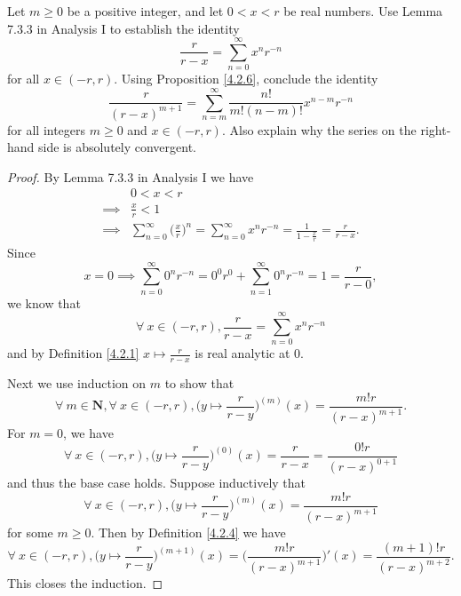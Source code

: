\begin{exercise}\label{ex 4.2.7}
    Let \(m \geq 0\) be a positive integer, and let \(0 < x < r\) be real numbers.
    Use Lemma 7.3.3 in Analysis I to establish the identity
    \[
        \frac{r}{r - x} = \sum_{n = 0}^\infty x^n r^{-n}
    \]
    for all \(x \in (-r, r)\).
    Using Proposition \ref{4.2.6}, conclude the identity
    \[
        \frac{r}{(r - x)^{m + 1}} = \sum_{n = m}^\infty \frac{n!}{m! (n - m)!} x^{n - m} r^{-n}
    \]
    for all integers \(m \geq 0\) and \(x \in (-r, r)\).
    Also explain why the series on the right-hand side is absolutely convergent.
\end{exercise}

\begin{proof}
    By Lemma 7.3.3 in Analysis I we have
    \begin{align*}
                 & 0 < x < r                                                                                                                     \\
        \implies & \frac{x}{r} < 1                                                                                                               \\
        \implies & \sum_{n = 0}^\infty \bigg(\frac{x}{r}\bigg)^n = \sum_{n = 0}^\infty x^n r^{-n} = \frac{1}{1 - \frac{x}{r}} = \frac{r}{r - x}.
    \end{align*}
    Since
    \[
        x = 0 \implies \sum_{n = 0}^\infty 0^n r^{-n} = 0^0 r^{0} + \sum_{n = 1}^\infty 0^n r^{-n} = 1 = \frac{r}{r - 0},
    \]
    we know that
    \[
        \forall\ x \in (-r, r), \frac{r}{r - x} = \sum_{n = 0}^\infty x^n r^{-n}
    \]
    and by Definition \ref{4.2.1} \(x \mapsto \frac{r}{r - x}\) is real analytic at \(0\).

    Next we use induction on \(m\) to show that
    \[
        \forall\ m \in \mathbf{N}, \forall\ x \in (-r, r), \bigg(y \mapsto \frac{r}{r - y}\bigg)^{(m)}(x) = \frac{m! r}{(r - x)^{m + 1}}.
    \]
    For \(m = 0\), we have
    \[
        \forall\ x \in (-r, r), \bigg(y \mapsto \frac{r}{r - y}\bigg)^{(0)}(x) = \frac{r}{r - x} = \frac{0! r}{(r - x)^{0 + 1}}
    \]
    and thus the base case holds.
    Suppose inductively that
    \[
        \forall\ x \in (-r, r), \bigg(y \mapsto \frac{r}{r - y}\bigg)^{(m)}(x) = \frac{m! r}{(r - x)^{m + 1}}
    \]
    for some \(m \geq 0\).
    Then by Definition \ref{4.2.4} we have
    \[
        \forall\ x \in (-r, r), \bigg(y \mapsto \frac{r}{r - y}\bigg)^{(m + 1)}(x) = \bigg(\frac{m! r}{(r - x)^{m + 1}}\bigg)'(x) = \frac{(m + 1)! r}{(r - x)^{m + 2}}.
    \]
    This closes the induction.


\end{proof}
